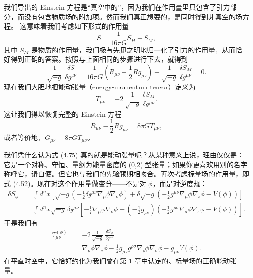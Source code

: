 我们导出的 Einstein 方程是“真空中的”，因为我们在作用量里只包含了引力部分，而没有包含物质场的附加项。然而我们真正想要的，是同时得到非真空的场方程。
这意味着我们考虑如下形式的作用量
\begin{equation*}
S = \frac{1}{16\pi G}S_H + S_M,
\tag{4.73}
\end{equation*}
其中 $S_M$ 是物质的作用量，我们极有先见之明地归一化了引力的作用量，从而恰好得到正确的答案。按照与上面相同的步骤进行下去，就得到
\begin{equation*}
\frac{1}{\sqrt{-g}}\,\frac{\delta S}{\delta g^{\mu\nu}} = \frac{1}{16\pi G}\left(R_{\mu\nu}-\frac{1}{2}Rg_{\mu\nu}\right)+\frac{1}{\sqrt{-g}}\,\frac{\delta S_M}{\delta g^{\mu\nu}} = 0.
\tag{4.74}
\end{equation*}
现在我们大胆地把能动张量（energy-momentum tensor）定义为
\begin{equation*}
T_{\mu\nu} = -2\,\frac{1}{\sqrt{-g}}\,\frac{\delta S_M}{\delta g^{\mu\nu}}.
\tag{4.75}
\end{equation*}
这让我们得以恢复完整的 Einstein 方程
\begin{equation*}
R_{\mu\nu}-\frac{1}{2}Rg_{\mu\nu} = 8\pi G T_{\mu\nu},
\tag{4.76}
\end{equation*}
或者等价地，$G_{\mu\nu}=8\pi G T_{\mu\nu}$。

我们凭什么认为式 (4.75) 真的就是能动张量呢？从某种意义上说，理由仅仅是：它是一个对称、守恒、量纲为能量密度的 (0,2) 型张量；如果你更喜欢用别的名字称呼它，请自便。但它也与我们的先验预期相吻合。再次考虑标量场的作用量，即式 (4.52)。现在对这个作用量做变分——不是对 $\phi$，而是对逆度规：
\begin{align*}
\delta S_\phi &= \int d^nx\left[\sqrt{-g}\left(-\frac{1}{2}\delta g^{\mu\nu}\nabla_\mu\phi\nabla_\nu\phi\right)+\delta\sqrt{-g}\left(-\frac{1}{2}g^{\mu\nu}\nabla_\mu\phi\nabla_\nu\phi - V(\phi)\right)\right] \tag{4.77}\\
&= \int d^nx\sqrt{-g}\,\delta g^{\mu\nu}\left[-\frac{1}{2}\nabla_\mu\phi\nabla_\nu\phi+\left(-\frac{1}{2}g_{\mu\nu}\right)\left(-\frac{1}{2}g^{\rho\sigma}\nabla_\rho\phi\nabla_\sigma\phi - V(\phi)\right)\right]. \tag{4.78}
\end{align*}
于是我们有
\begin{align*}
T^{(\phi)}_{\mu\nu} &= -2\,\frac{1}{\sqrt{-g}}\,\frac{\delta S_\phi}{\delta g^{\mu\nu}}\\
&= \nabla_\mu\phi\nabla_\nu\phi - \frac{1}{2}g_{\mu\nu}g^{\rho\sigma}\nabla_\rho\phi\nabla_\sigma\phi - g_{\mu\nu}V(\phi). \tag{4.79}
\end{align*}
在平直时空中，它恰好约化为我们曾在第 1 章中认定的、标量场的正确能动张量。

